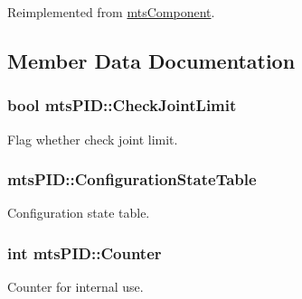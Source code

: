 Reimplemented from \hyperlink{classmts_component_aaf28f0262b44eb6866e10089a02fa6e4}{mts\+Component}.



\subsection{Member Data Documentation}
\hypertarget{classmts_p_i_d_a951636db1802cb277a716bd8ee8aea45}{}
\subsubsection[{Check\+Joint\+Limit}]{\setlength{\rightskip}{0pt plus 5cm}bool mts\+P\+I\+D\+::\+Check\+Joint\+Limit\hspace{0.3cm}{\ttfamily [protected]}}\label{classmts_p_i_d_a951636db1802cb277a716bd8ee8aea45}


Flag whether check joint limit. 

\hypertarget{classmts_p_i_d_a06df8f0f65fe6954383297ead5a689e8}{}
\subsubsection[{Configuration\+State\+Table}]{ mts\+P\+I\+D\+::\+Configuration\+State\+Table\hspace{0.3cm}{\ttfamily [protected]}}\label{classmts_p_i_d_a06df8f0f65fe6954383297ead5a689e8}


Configuration state table. 

\hypertarget{classmts_p_i_d_a7a1c2963d1d2b65a210464b9ef0d775f}{}
\subsubsection[{Counter}]{\setlength{\rightskip}{0pt plus 5cm}int mts\+P\+I\+D\+::\+Counter\hspace{0.3cm}{\ttfamily [protected]}}\label{classmts_p_i_d_a7a1c2963d1d2b65a210464b9ef0d775f}


Counter for internal use. 

